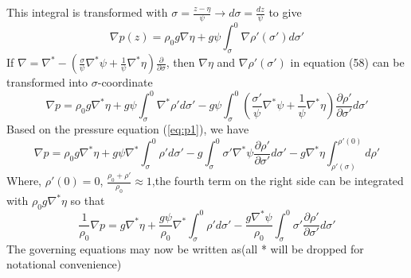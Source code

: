 \documentclass[oribibl]{llncs}
\begin{document}
This integral is transformed with $\sigma=\frac{z-\eta}{\psi} \rightarrow d\sigma=\frac{dz}{\psi} $ to give
\begin{equation}
\nabla p(z) = \rho_0 g \nabla\eta +g \psi\int_\sigma^0 \nabla\rho'(\sigma') d\sigma'
\end{equation}
If $\nabla = \nabla^* -\left( \frac{\sigma}{\psi}\nabla^*\psi +\frac{1}{\psi}\nabla^*\eta \right)\frac{\partial}{\partial \sigma}$, then $\nabla\eta$ and $\nabla\rho'(\sigma')$ in equation (58) can be transformed into $\sigma$-coordinate 
\begin{equation}\label{eq:p1}
\nabla p = \rho_0 g \nabla^*\eta  + g \psi\int_\sigma^0 \nabla^* \rho' d\sigma' - g\psi \int_\sigma^0(\frac{\sigma'}{\psi}\nabla^*\psi +\frac{1}{\psi}\nabla^*\eta) \frac{\partial \rho'}{\partial \sigma'} d\sigma'
\end{equation}
Based on the pressure equation (\ref{eq:p1}), we have 
\begin{equation}
\nabla p = \rho_0 g \nabla^* \eta  + g\psi\nabla^*\int_\sigma^0\rho' d\sigma' -  g\int_\sigma^0\sigma'\nabla^*\psi\frac{\partial \rho'}{\partial \sigma'} d\sigma'  -g\nabla^* \eta \int_{\rho'(\sigma)}^{\rho'(0)} d\rho' 
\end{equation}
Where, ${\rho'(0)=0}$, ${\frac{\rho_0+\rho'}{\rho_0} \approx 1}$,the fourth term on the right side can be integrated with ${\rho_0g \nabla^*\eta}$ so that
\begin{equation}
\frac{1}{\rho_0}\nabla p = g \nabla^* \eta  +\frac{g\psi}{\rho_0}\nabla^*\int_\sigma^0\rho'd\sigma'  -\frac{g\nabla^*\psi}{\rho_0}\int_\sigma^0\sigma'\frac{\partial \rho'}{\partial \sigma'} d\sigma'
\end{equation}
The governing equations may now be written as(all * will be dropped for notational convenience)
\end{document}
